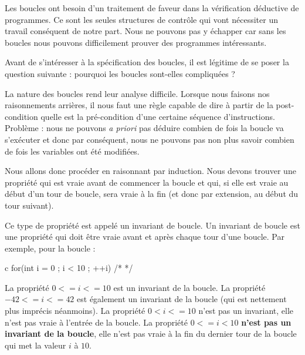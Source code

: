Les boucles ont besoin d'un traitement de faveur dans la vérification déductive
de programmes. Ce sont les seules structures de contrôle qui vont nécessiter un
travail conséquent de notre part. Nous ne pouvons pas y échapper car sans les 
boucles nous pouvons difficilement prouver des programmes intéressants.



Avant de s'intéresser à la spécification des boucles, il est légitime de se 
poser la question suivante : pourquoi les boucles sont-elles compliquées ?





La nature des boucles rend leur analyse difficile. Lorsque nous faisons nos 
raisonnements arrières, il nous faut une règle capable de dire à partir de la
post-condition quelle est la pré-condition d'une certaine séquence 
d'instructions. Problème : nous ne pouvons \textit{a priori} pas déduire combien de 
fois la boucle va s'exécuter et donc par conséquent, nous ne pouvons pas non 
plus savoir combien de fois les variables ont été modifiées.



Nous allons donc procéder en raisonnant par induction. Nous devons trouver une
propriété qui est vraie avant de commencer la boucle et qui, si elle est vraie
au début d'un tour de boucle, sera vraie à la fin (et donc par extension, au 
début du tour suivant).



Ce type de propriété est appelé un invariant de boucle. Un invariant de boucle
est une propriété qui doit être vraie avant et après chaque tour d'une boucle. 
Par exemple, pour la boucle :



\begin{CodeBlock}{c}
for(int i = 0 ; i < 10 ; ++i){ /* */ }
\end{CodeBlock}



La propriété $0 <= i <= 10$ est un invariant de la boucle. La propriété 
$-42 <= i <= 42$ est également un invariant de la boucle (qui est nettement
plus imprécis néanmoins). La propriété $0 < i <= 10$ n'est pas un invariant,
elle n'est pas vraie à l'entrée de la boucle. La propriété $0 <= i < 10$ 
\textbf{n'est pas un invariant de la boucle}, elle n'est pas vraie à la fin du 
dernier tour de la boucle qui met la valeur $i$ à $10$.



